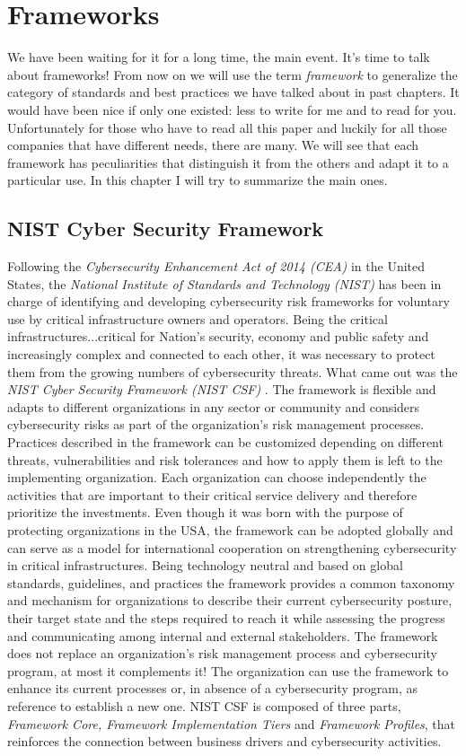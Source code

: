 \chapter{Frameworks}
We have been waiting for it for a long time, the main event. It's time to talk about frameworks! From now on we will use the term \textit{framework} to generalize the category of standards and best practices we have talked about in past chapters. It would have been nice if only one existed: less to write for me and to read for you. Unfortunately for those who have to read all this paper and luckily for all those companies that have different needs, there are many. We will see that each framework has peculiarities that distinguish it from the others and adapt it to a particular use. In this chapter I will try to summarize the main ones.
\section{NIST Cyber Security Framework}
Following the \textit{Cybersecurity Enhancement Act of 2014 (CEA)} in the United States, the \textit{National Institute of Standards and Technology (NIST)} has been in charge of identifying and developing cybersecurity risk frameworks for voluntary use by critical infrastructure owners and operators. Being the critical infrastructures...critical for Nation's security, economy and public safety and increasingly complex and connected to each other, it was necessary to protect them from the growing numbers of cybersecurity threats. What came out was the \textit{NIST Cyber Security Framework (NIST CSF)} \cite{NIST2018}. The framework is flexible and adapts to different organizations in any sector or community and considers cybersecurity risks as part of the organization’s risk management processes. Practices described in the framework can be customized depending on different threats, vulnerabilities and risk tolerances and how to apply them is left to the implementing organization. Each organization can choose independently the activities that are important to their critical service delivery and therefore prioritize the investments. Even though it was born with the purpose of protecting organizations in the USA, the framework can be adopted globally and can serve as a model for international cooperation on strengthening cybersecurity in critical infrastructures. Being technology neutral and based on global standards, guidelines, and practices the framework provides a common taxonomy and mechanism for organizations to describe their current cybersecurity posture, their target state and the steps required to reach it while assessing the progress and communicating among internal and external stakeholders. The framework does not replace an organization’s risk management process and cybersecurity program, at most it complements it! The organization can use the framework to enhance its current processes or, in absence of a cybersecurity program, as reference to establish a new one. NIST CSF is composed of three parts, \textit{Framework Core, Framework Implementation Tiers} and \textit{Framework Profiles}, that reinforces the connection between business drivers and cybersecurity activities.
